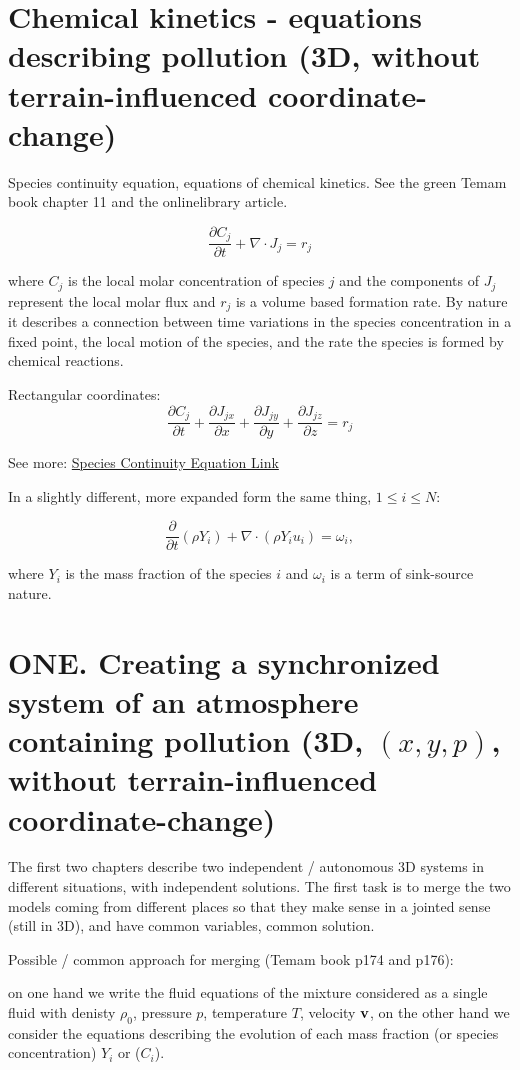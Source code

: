 \documentclass{article}
\begin{document}
\section{Chemical kinetics - equations describing pollution (3D, without terrain-influenced coordinate-change)}

Species continuity equation, equations of chemical kinetics. See the green Temam book chapter 11 and the onlinelibrary article.

\[ \frac{\partial C_j}{\partial t} + \nabla \cdot J_j = r_j\]

where $C_j$ is the local molar concentration of species $j$ and the components of $J_j$ represent the local molar flux and $r_j$ is a volume based formation rate. By nature it describes a connection between time variations in the species concentration in a fixed point, the local motion of the species, and the rate the species is formed by chemical reactions.

Rectangular coordinates:
\[ \frac{\partial C_j}{\partial t} + \frac{\partial J_{jx}}{\partial x} + \frac{\partial J_{jy}}{\partial y} + \frac{\partial J_{jz}}{\partial z} = r_j\]

See more:  \href{http://onlinelibrary.wiley.com/store/10.1002/9780470385821.app2/asset/app2.pdf?v=1&t=j8hq64jc&s=73a5b190bd254e88c91326f7e9c6b660aeca4949}{Species Continuity Equation Link}

In a slightly different, more expanded form the same thing, $1 \leq i \leq N$:

\[ \frac{\partial}{\partial t} (\rho Y_i) + \nabla \cdot (\rho Y_i u_i) = \omega_i,\]

where $Y_i$ is the mass fraction of the species $i$ and $\omega_i$ is a term of sink-source nature. 

\section{ONE. Creating a synchronized system of an atmosphere containing pollution (3D, $(x,y,p)$, without terrain-influenced coordinate-change)}
The first two chapters describe two independent / autonomous 3D systems in different situations, with independent solutions. The first task is to merge the two models coming from different places so that they make sense in a jointed sense (still in 3D), and have common variables, common solution.

Possible / common approach for merging (Temam book p174 and p176):

\begin{outline}[enumerate]

\1 on one hand we write the fluid equations of the mixture considered as a single fluid with denisty $\rho_0$, pressure $p$, temperature $T$, velocity $\bold{v}$,
\1 on the other hand we consider the equations describing the evolution of each mass fraction (or species concentration) $Y_i$ or ($C_i$). 

\end{outline}
\end{document}
